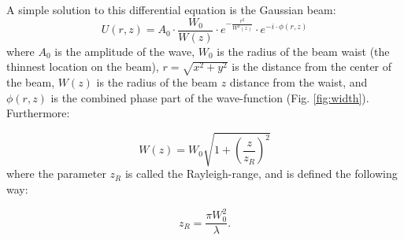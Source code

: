     A simple solution to this differential equation is the Gaussian beam:
    \begin{equation}
      U(r,z) = A_0 \cdot \frac{W_0}{W(z)} \cdot e^{-\frac{r^2}{W^2(z)}}\cdot e^{-i\cdot \phi(r,z)}
    \label{eq:gaussian}
    \end{equation}
    where $A_0$ is the amplitude of the wave, $W_0$ is the radius of the beam waist (the thinnest location on the beam), $r=\sqrt{x^2+y^2}$ is the distance from the center of the beam, $W(z)$ is the radius of the beam $z$ distance from the waist, and $\phi(r,z)$ is the combined phase part of the wave-function (Fig. \ref{fig:width}). Furthermore:

    \begin{equation}
      W(z) = W_0\sqrt{1+\left( \frac{z}{z_R} \right)^2}
    \end{equation}
    where the parameter $z_R$ is called the Rayleigh-range, and is defined the following way:

    \begin{equation}
      z_R = \frac{\pi W_0^2}{\lambda}.
      \label{eq:rayleigh}
    \end{equation}
    


